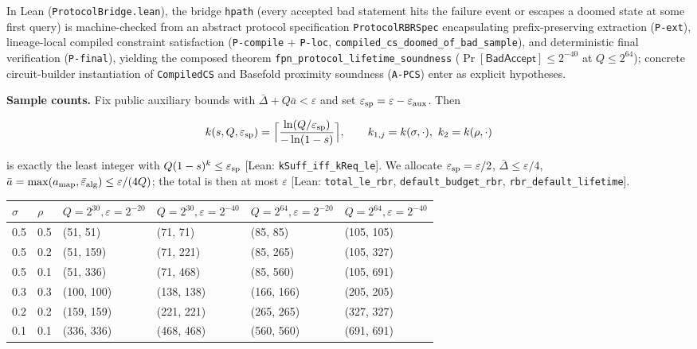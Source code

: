 \documentclass[10pt]{article}
\begin{document}
In Lean (\texttt{ProtocolBridge.\allowbreak{}lean}), the bridge \texttt{hpath} (every accepted bad statement hits the failure event or escapes a doomed state at some first query) is machine-checked from an abstract protocol specification \texttt{ProtocolRBRSpec} encapsulating prefix-preserving extraction (\texttt{P-ext}), lineage-local compiled constraint satisfaction (\texttt{P-compile} + \texttt{P-loc}, \texttt{compiled\_\allowbreak{}cs\_\allowbreak{}doomed\_\allowbreak{}of\_\allowbreak{}bad\_\allowbreak{}sample}), and deterministic final verification (\texttt{P-final}), yielding the composed theorem \texttt{fpn\_\allowbreak{}protocol\_\allowbreak{}lifetime\_\allowbreak{}soundness} ($\Pr[\mathsf{BadAccept}]\le 2^{-40}$ at $Q\le 2^{64}$); concrete circuit-builder instantiation of \texttt{CompiledCS} and Basefold proximity soundness (\texttt{A-PCS}) enter as explicit hypotheses.

\textbf{Sample counts.} Fix public auxiliary bounds with $\bar\Delta+Q\bar a<\varepsilon$ and set $\varepsilon_{\rm sp}=\varepsilon-\varepsilon_{\rm aux}$. Then

\[k(s,Q,\varepsilon_{\rm sp})=\Big\lceil\frac{\ln(Q/\varepsilon_{\rm sp})}{-\ln(1-s)}\Big\rceil,\qquad k_{1,j}=k(\sigma,\cdot),\ k_2=k(\rho,\cdot)\]

is exactly the least integer with $Q(1-s)^k\le\varepsilon_{\rm sp}$ [Lean: \texttt{kSuff\_\allowbreak{}iff\_\allowbreak{}kReq\_\allowbreak{}le}]. We allocate $\varepsilon_{\rm sp}=\varepsilon/2$, $\bar\Delta\le\varepsilon/4$, $\bar a=\max(a_{\rm map},\bar\varepsilon_{\rm alg})\le\varepsilon/(4Q)$; the total is then at most $\varepsilon$ [Lean: \texttt{total\_\allowbreak{}le\_\allowbreak{}rbr}, \texttt{default\_\allowbreak{}budget\_\allowbreak{}rbr}, \texttt{rbr\_\allowbreak{}default\_\allowbreak{}lifetime}].

\begin{center}\small
\begin{tabularx}{\linewidth}{YYYYYY}
\toprule
{}\textbf{$\sigma$} & {}\textbf{$\rho$} & {}\textbf{$Q=2^{30},\varepsilon=2^{-20}$} & {}\textbf{$Q=2^{30},\varepsilon=2^{-40}$} & {}\textbf{$Q=2^{64},\varepsilon=2^{-20}$} & {}\textbf{$Q=2^{64},\varepsilon=2^{-40}$} \\
\midrule
{}0.5 & {}0.5 & {}(51, 51) & {}(71, 71) & {}(85, 85) & {}(105, 105) \\
{}0.5 & {}0.2 & {}(51, 159) & {}(71, 221) & {}(85, 265) & {}(105, 327) \\
{}0.5 & {}0.1 & {}(51, 336) & {}(71, 468) & {}(85, 560) & {}(105, 691) \\
{}0.3 & {}0.3 & {}(100, 100) & {}(138, 138) & {}(166, 166) & {}(205, 205) \\
{}0.2 & {}0.2 & {}(159, 159) & {}(221, 221) & {}(265, 265) & {}(327, 327) \\
{}0.1 & {}0.1 & {}(336, 336) & {}(468, 468) & {}(560, 560) & {}(691, 691) \\
\bottomrule
\end{tabularx}
\end{center}
\end{document}
